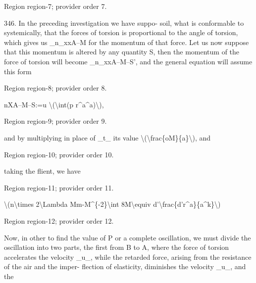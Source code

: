 \documentclass[11pt]{article}
\begin{document}
{\scriptsize\color{gray} Region region-7; provider order 7.\par}
\medskip

346. In the preceding investigation we have suppo- soil, what is conformable to systemically, that the forces of torsion is proportional to the angle of torsion, which gives us \_n\_xxA--M for the momentum of that force. Let us now suppose that this momentum is altered by any quantity S, then the momentum of the force of torsion will become \_n\_xxA--M--S’, and the general equation will assume this form
\par

{\scriptsize\color{gray} Region region-8; provider order 8.\par}
\medskip

nXA--M--S:=u \textbackslash{}(\textbackslash{}int(p r\textasciicircum{}a\textasciicircum{}a)\textbackslash{}),
\par

{\scriptsize\color{gray} Region region-9; provider order 9.\par}
\medskip

and by multiplying in place of \_t\_ its value \textbackslash{}(\textbackslash{}frac\{oM\}\{a\}\textbackslash{}), and
\par

{\scriptsize\color{gray} Region region-10; provider order 10.\par}
\medskip

taking the flient, we have
\par

{\scriptsize\color{gray} Region region-11; provider order 11.\par}
\medskip

\textbackslash{}(n\textbackslash{}times 2\textbackslash{}Lambda Mm-M\textasciicircum{}\{-2\}\textbackslash{}int 8M\textbackslash{}equiv d'\textbackslash{}frac\{d'r\textasciicircum{}a\}\{a\textasciicircum{}k\}\textbackslash{})
\par

{\scriptsize\color{gray} Region region-12; provider order 12.\par}
\medskip

Now, in other to find the value of P or a complete oscillation, we must divide the oscillation into two parts, the first from B to A, where the force of torsion accelerates the velocity \_u\_, while the retarded force, arising from the resistance of the air and the imper- flection of elasticity, diminishes the velocity \_u\_, and the
\par
\end{document}

